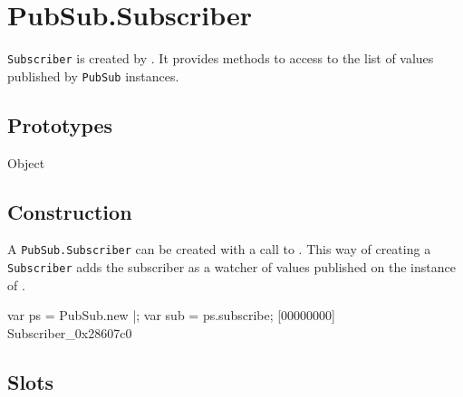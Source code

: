 
\section{PubSub.Subscriber}

\lstinline|Subscriber| is created by .  It
provides methods to access to the list of values published by
\lstinline|PubSub| instances.

\subsection{Prototypes}

\begin{refObjects}
\item[Object]
\end{refObjects}

\subsection{Construction}

A \lstinline|PubSub.Subscriber| can be created with a call to
.  This way of creating a \lstinline|Subscriber|
adds the subscriber as a watcher of values published on the instance of
.

\begin{urbiscript}[firstnumber=1]
var ps = PubSub.new |;
var sub = ps.subscribe;
[00000000] Subscriber_0x28607c0
\end{urbiscript}

\subsection{Slots}

